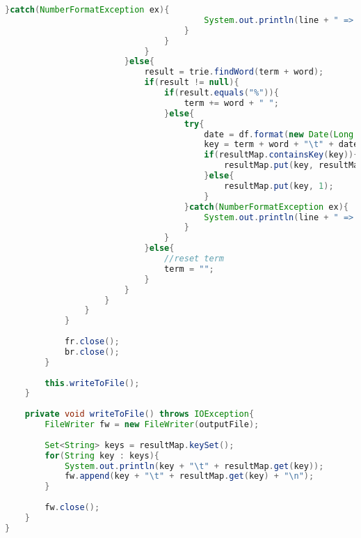 \begin{lstlisting}[language=Java,basicstyle=\tiny,caption=Counter.java]
                                    }catch(NumberFormatException ex){
                                        System.out.println(line + " => " + ex.toString());
                                    }
                                }
                            }
                        }else{
                            result = trie.findWord(term + word);
                            if(result != null){
                                if(result.equals("%")){
                                    term += word + " ";
                                }else{
                                    try{
                                        date = df.format(new Date(Long.parseLong(parse[parse.length - 1])));
                                        key = term + word + "\t" + date;
                                        if(resultMap.containsKey(key)){
                                            resultMap.put(key, resultMap.get(key) + 1);
                                        }else{
                                            resultMap.put(key, 1);
                                        }
                                    }catch(NumberFormatException ex){
                                        System.out.println(line + " => " + ex.toString());
                                    }
                                }
                            }else{
                                //reset term
                                term = "";
                            }
                        }
                    }
                }
            }
            
            fr.close();
            br.close();
        }
        
        this.writeToFile();
    }
    
    private void writeToFile() throws IOException{
        FileWriter fw = new FileWriter(outputFile);
        
        Set<String> keys = resultMap.keySet();
        for(String key : keys){
            System.out.println(key + "\t" + resultMap.get(key));
            fw.append(key + "\t" + resultMap.get(key) + "\n");
        }
        
        fw.close();
    }
}
\end{lstlisting}

